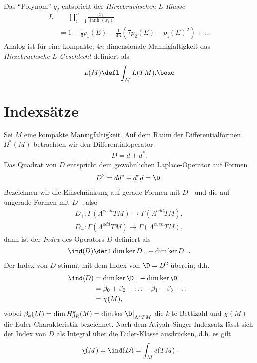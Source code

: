 \documentclass[%
	paper=a5,%
	fleqn,%
	DIV=18,%
	BCOR=0mm,
	fontsize=11pt,
	titlepage=false,%
	bibliography=totoc,
	DIV=18,%
	twoside=true,
	pdftitle=Riemannsche Geometrie,
	pdfauthor=Uwe Semmelmann,
	numbers=noendperiod]%
	{scrbook}
\begin{document}
\begin{ex}
\begin{exenum}
\begin{align*}
\end{align*}
Das ``Polynom'' $q_{f}$ entspricht der \emph{Hirzebruchschen $L$-Klasse}
\begin{align*}
L &= \prod_{i=1}^n \frac{x_{i}}{\tanh(x_{i})}\\
&= 1 + \frac{1}{3}p_{1}(E) - \frac{1}{45}\left(7p_{2}(E) - p_{1}(E)^2\right) \pm \ldots
\end{align*}
Analog ist für eine kompakte, $4n$ dimensionale Mannigfaltigkeit das \emph{Hirzebruchsche $L$-Geschlecht} definiert als
\begin{align*}
L(M) \defl \int_{M} L(TM).\boxc
\end{align*}
\end{exenum}
\end{ex}

\section{Indexsätze}

Sei $M$ eine kompakte Mannigfaltigkeit. Auf dem Raum der Differentialformen $\Omega^*(M)$ betrachten wir den Differentialoperator
\begin{align*}
D = d + d^*.
\end{align*}
Das Quadrat von $D$ entspricht dem gewöhnlichen Laplace-Operator auf Formen
\begin{align*}
D^2 = dd^*+d^*d = \D.
\end{align*}
Bezeichnen wir die Einschränkung auf gerade Formen mit $D_{+}$ und die auf ungerade Formen mit $D_{-}$, also
\begin{align*}
D_{+} : \Gamma(\Lambda^{even}TM)\to \Gamma(\Lambda^{odd}TM),\\
D_{-} : \Gamma(\Lambda^{odd}TM)\to \Gamma(\Lambda^{even}TM),
\end{align*}
dann ist der \emph{Index} des Operators $D$ definiert als
\begin{align*}
\ind(D)\defl \dim \ker D_{+} - \dim \ker D_{-}.
\end{align*}
Der Index von $D$ stimmt mit dem Index von $\D=D^2$ überein, d.h.
\begin{align*}
\ind(D)
& = \dim \ker \D_{+} - \dim \ker \D_{-}\\ & =
\beta_{0} + \beta_{2} + \ldots - \beta_{1}-\beta_{3}-\ldots\\
&=\chi(M),
\end{align*}
wobei $\beta_{k}(M) = \dim H^k_{dR}(M) = \dim \ker \D\big|_{\Lambda^k TM}$ die $k$-te Bettizahl und $\chi(M)$ die Euler-Charakteristik bezeichnet.
Nach dem Atiyah–Singer Indexsatz lässt sich der Index von $D$ als Integral über die Euler-Klasse ausdrücken, d.h. es gilt
\begin{align*}
\chi(M) = \ind(D) = \int_{M} e(TM).
\end{align*}
\end{document}
